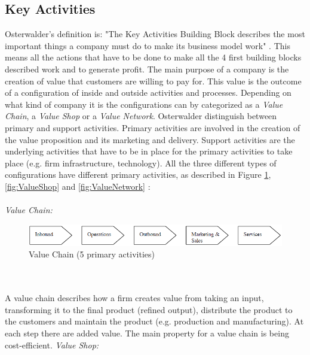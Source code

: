 \subsection{Key Activities}
Osterwalder’s definition is: "The Key Activities Building Block describes the most important things a company must do to make its business model work" \cite{osterwalder}. This means all the actions that have to be done to make all the 4 first building blocks described work and to generate profit. The main purpose of a company is the creation of value that customers are willing to pay for. This value is the outcome of a configuration of inside and outside activities and processes. Depending on what kind of company it is the configurations can by categorized as a \emph{Value Chain}, a \emph{Value Shop} or a \emph{Value Network}. Osterwalder distinguish between primary and support activities. Primary activities are involved in the creation of the value proposition and its marketing and delivery. Support activities are the underlying activities that have to be in place for the primary activities to take place (e.g. firm infrastructure, technology). All the three different types of configurations have different primary activities, as described in Figure \ref{fig:ValueChain}, \ref{fig:ValueShop} and \ref{fig:ValueNetwork} \cite{osterwalderthesis}:\\ \\
\emph{Value Chain:}
\begin{figure}[h]
\centering
\begin{center}
\includegraphics[scale=0.6]{valuechainnew}
\caption[Value Chain]{Value Chain (5 primary activities) \cite{osterwalderthesis}}
\label{fig:ValueChain}
\end{center}
\end{figure} \\ \\
A value chain describes how a firm creates value from taking an input, transforming it to the final product (refined output), distribute the product  to the customers and maintain the product (e.g. production and manufacturing). At each step there are added value. The main property for a value chain is being cost-efficient.
\newpage
\emph{Value Shop:}
